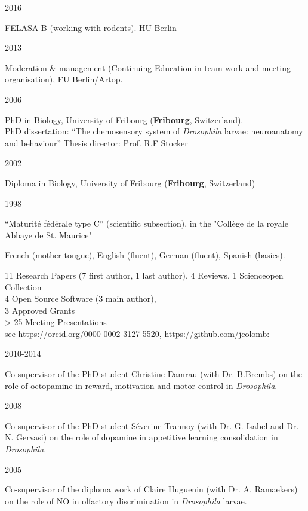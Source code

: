         
\parbox{0.15\textwidth}{2016}\hfill
\parbox[t]{0.83\textwidth}{FELASA B (working with rodents). HU Berlin
        }
\parbox{0.15\textwidth}{2013}\hfill
\parbox[t]{0.83\textwidth}{Moderation \& management (Continuing Education in team work and meeting organisation), FU Berlin/Artop.
        }
\parbox{0.15\textwidth}{2006}\hfill
\parbox[t]{0.83\textwidth}{PhD in Biology,
        University of Fribourg (\textbf{Fribourg}, Switzerland).\\
        PhD dissertation: ``The chemosensory system of \textit{Drosophila} larvae: neuroanatomy and behaviour''
        Thesis director: Prof. R.F Stocker}
\parbox{0.15\textwidth}{2002}\hfill
\parbox[t]{0.83\textwidth}{Diploma in Biology,
        University of Fribourg (\textbf{Fribourg}, Switzerland)
        }
\parbox{0.15\textwidth}{1998}\hfill
\parbox[t]{0.83\textwidth}{``Maturit\'e f\'ed\'erale type C'' (scientific subsection),
in the "Coll\`ege de la royale Abbaye de St. Maurice"}

 French (mother tongue), English (fluent),
German (fluent), Spanish (basics).

%
11 Research Papers (7 first author, 1 last author), 4 Reviews, 1 Scienceopen Collection\\
 4 Open Source Software (3 main author), \\
 3 Approved Grants \\
 > 25 Meeting Presentations \\
 see https://orcid.org/0000-0002-3127-5520, https://github.com/jcolomb: %






\parbox{0.15\textwidth}{2010-2014}\hfill
	\parbox[t]{0.83\textwidth}{Co-supervisor of the PhD student Christine Damrau
(with Dr. B.Brembs) on the role of octopamine in reward, motivation and motor control in  \textit{Drosophila}.}
\parbox{0.15\textwidth}{2008}\hfill
	\parbox[t]{0.83\textwidth}{Co-supervisor of the PhD student S\'everine Trannoy
(with Dr. G. Isabel and Dr. N. Gervasi) on the role of dopamine in appetitive learning consolidation in  \textit{Drosophila}.}
\parbox{0.15\textwidth}{2005}\hfill
\parbox[t]{0.83\textwidth}{Co-supervisor of the diploma work of Claire Huguenin
(with Dr. A. Ramaekers) on the role of NO in olfactory discrimination in \textit{Drosophila} larvae.}






